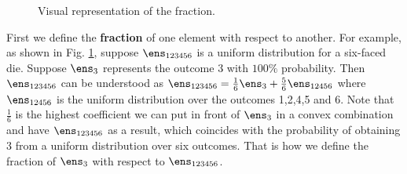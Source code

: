 \begin{figure}[h]
	\centering
	\def\xstep{0.75em}
	\def\bHeight{0.6}
	\def\tHeight{0.1}
	\def\tGap{0.3}
	\caption{Visual representation of the fraction.}\label{pm-es-fig-fraction}
\end{figure}

First we define the \textbf{fraction} of one element with respect to another. For example, as shown in Fig. \ref{pm-es-fig-fraction}, suppose $\ens_{123456}$ is a uniform distribution for a six-faced die. Suppose $\ens_3$ represents the outcome 3 with $100\%$ probability. Then $\ens_{123456}$ can be understood as $\ens_{123456} = \frac{1}{6} \ens_3 + \frac{5}{6} \ens_{12456}$ where $\ens_{12456}$ is the uniform distribution over the outcomes 1,2,4,5 and 6. Note that $\frac{1}{6}$ is the highest coefficient we can put in front of $\ens_3$ in a convex combination and have $\ens_{123456}$ as a result, which coincides with the probability of obtaining 3 from a uniform distribution over six outcomes. That is how we define the fraction of $\ens_3$ with respect to $\ens_{123456}$.

